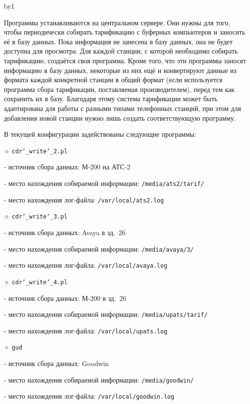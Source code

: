 \vfill
\eject
\removelastskip\bigskip\medskip
\advance\secnum by1 
\noindent\rectangle{16pt}{9pt}{25pt}{\bbbf\the\secnum}%
\par
\nobreak\medskip

\bigskip

\noindent
Программы устанавливаются на центральном сервере. Они нужны для того, чтобы периодически собирать тарификацию с буферных компьютеров и заносить её в базу данных. Пока информация не занесена в базу данных, она не будет доступна для просмотра.
\smallskip
\noindent
Для каждой станции, с которой необходимо собирать тарификацию, создаётся своя программа. Кроме того, что эти программы заносят информацию в базу данных, некоторые из них ещё и конвертируют данные из формата каждой конкретной станции в общий формат (если используется программа сбора тарификации, поставляемая производителем), перед тем как сохранить их в базу. Благодаря этому система тарификации может быть адаптирована для работы с разными типами телефонных станций, при этом для добавления новой станции нужно лишь создать соответствующую программу.
\bigskip

\noindent
В текущей конфигурации задействованы следующие программы:
\medskip

\noindent $\diamond$ {\tt cdr\char`_write\char`_2.pl}
\item{} - источник сбора данных: М-200 на АТС-2
\item{} - место нахождения собираемой информации: {\tt /media/ats2/tarif/}
\item{} - место нахождения лог-файла: {\tt /var/local/ats2.log}
\smallskip

\noindent $\diamond$ {\tt cdr\char`_write\char`_3.pl}
\item{} - источник сбора данных: Avaya в зд.~26
\item{} - место нахождения собираемой информации: {\tt /media/avaya/3/}
\item{} - место нахождения лог-файла: {\tt /var/local/avaya.log}
\smallskip

\noindent $\diamond$ {\tt cdr\char`_write\char`_4.pl}
\item{} - источник сбора данных: М-200 в зд.~26
\item{} - место нахождения собираемой информации: {\tt /media/upats/tarif/}
\item{} - место нахождения лог-файла: {\tt /var/local/upats.log}
\smallskip

\noindent $\diamond$ {\tt gud}
\item{} - источник сбора данных: Goodwin
\item{} - место нахождения собираемой информации: {\tt /media/goodwin/}
\item{} - место нахождения лог-файла: {\tt /var/local/goodwin.log}
\smallskip

